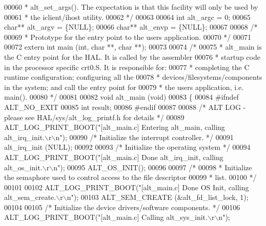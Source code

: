 \begin{DoxyCode}
00060 \textcolor{comment}{ * alt\_set\_args(). The expectation is that this facility will only be used by}
00061 \textcolor{comment}{ * the iclient/ihost utility.}
00062 \textcolor{comment}{ */}
00063 
00064 \textcolor{keywordtype}{int}    alt_argc = 0;
00065 \textcolor{keywordtype}{char}** alt_argv = \{NULL\};
00066 \textcolor{keywordtype}{char}** alt_envp = \{NULL\};
00067 
00068 \textcolor{comment}{/*}
00069 \textcolor{comment}{ * Prototype for the entry point to the users application.}
00070 \textcolor{comment}{ */}
00071 
00072 \textcolor{keyword}{extern} \textcolor{keywordtype}{int} main (\textcolor{keywordtype}{int}, \textcolor{keywordtype}{char} **, \textcolor{keywordtype}{char} **);
00073 
00074 \textcolor{comment}{/*}
00075 \textcolor{comment}{ * alt\_main is the C entry point for the HAL. It is called by the assembler}
00076 \textcolor{comment}{ * startup code in the processor specific crt0.S. It is responsible for:}
00077 \textcolor{comment}{ * completing the C runtime configuration; configuring all the}
00078 \textcolor{comment}{ * devices/filesystems/components in the system; and call the entry point for}
00079 \textcolor{comment}{ * the users application, i.e. main().}
00080 \textcolor{comment}{ */}
00081 
00082 \textcolor{keywordtype}{void} alt_main (\textcolor{keywordtype}{void})
00083 \{
00084 \textcolor{preprocessor}{#ifndef ALT\_NO\_EXIT    }
00085   \textcolor{keywordtype}{int} result;
00086 \textcolor{preprocessor}{#endif}
00087 
00088   \textcolor{comment}{/* ALT LOG - please see HAL/sys/alt\_log\_printf.h for details */}
00089   ALT_LOG_PRINT_BOOT(\textcolor{stringliteral}{"[alt\_main.c] Entering alt\_main, calling alt\_irq\_init.\(\backslash\)r\(\backslash\)n"});
00090   \textcolor{comment}{/* Initialize the interrupt controller. */}
00091   alt_irq_init (NULL);
00092 
00093   \textcolor{comment}{/* Initialize the operating system */}
00094   ALT_LOG_PRINT_BOOT(\textcolor{stringliteral}{"[alt\_main.c] Done alt\_irq\_init, calling alt\_os\_init.\(\backslash\)r\(\backslash\)n"});
00095   ALT_OS_INIT();
00096 
00097   \textcolor{comment}{/*}
00098 \textcolor{comment}{   * Initialize the semaphore used to control access to the file descriptor}
00099 \textcolor{comment}{   * list.}
00100 \textcolor{comment}{   */}
00101 
00102   ALT_LOG_PRINT_BOOT(\textcolor{stringliteral}{"[alt\_main.c] Done OS Init, calling alt\_sem\_create.\(\backslash\)r\(\backslash\)n"});
00103   ALT_SEM_CREATE (&alt\_fd\_list\_lock, 1);
00104 
00105   \textcolor{comment}{/* Initialize the device drivers/software components. */}
00106   ALT_LOG_PRINT_BOOT(\textcolor{stringliteral}{"[alt\_main.c] Calling alt\_sys\_init.\(\backslash\)r\(\backslash\)n"});

\end{DoxyCode}
